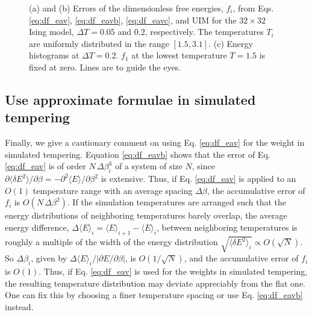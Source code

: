 \documentclass[aip,jcp,preprint,notitlepage, superscriptaddress]{revtex4-1}
\begin{document}
\begin{figure}[h]
  \caption{
    \label{fig:is2approx}
    (a) and (b) Errors of the dimensionless free energies, $f_i$,
    from Eqs. \eqref{eq:df_eav}, \eqref{eq:df_eavb}, \eqref{eq:df_eavc},
    and UIM for the $32\times 32$ Ising model,
    $\Delta T = 0.05$ and $0.2$, respectively.
    The temperatures $T_i$ are uniformly distributed
    in the range $[1.5, 3.1]$.
    (c) Energy histograms at $\Delta T = 0.2$.
    $f_1$ at the lowest temperature $T = 1.5$ is fixed at zero.
    Lines are to guide the eyes.
  }
\end{figure}





\subsection{Use approximate formulae in simulated tempering}



Finally, we give a cautionary comment
on using Eq. \eqref{eq:df_eav}
for the weight in simulated tempering\cite{park2007}.
%
Equation \eqref{eq:df_eavb} shows that
the error of Eq. \eqref{eq:df_eav}
is of order $N \, \Delta \beta_i^3$
of a system of size $N$,
since
$\partial \langle \delta E^2 \rangle / \partial \beta
= -\partial^2 \langle E \rangle / \partial \beta^2$
is extensive.
%
Thus,
if Eq. \eqref{eq:df_eav} is applied to
an $O(1)$ temperature range
with an average spacing $\Delta \beta$,
the accumulative error of $f_i$
is $O(N \, \Delta \beta^2)$.
%
If the simulation temperatures
are arranged
such that the energy distributions
of neighboring temperatures
barely overlap,
%
the average energy difference,
$\Delta \langle E \rangle_i = \langle E \rangle_{i+1} - \langle E \rangle_i$,
between neighboring temperatures
is roughly a multiple of the width of
the energy distribution
$\sqrt{ \langle \delta E^2 \rangle_i } \propto O(\sqrt{N})$.
%
So $\Delta \beta_i$,
given by $\Delta \langle E \rangle_i / |\partial E/\partial \beta|$,
is $O(1/\sqrt{N})$,
%
and the accumulative error
of $f_i$ is $O(1)$.
%
Thus, if Eq. \eqref{eq:df_eav}
is used for the weights
in simulated tempering\cite{park2007},
the resulting temperature distribution
may deviate appreciably
from the flat one.
%
One can fix this by choosing
a finer temperature spacing or
use Eq. \eqref{eq:df_eavb}
instead.




\end{document}
